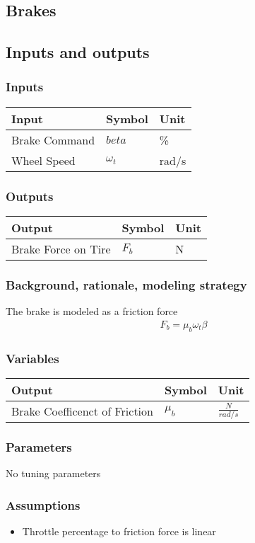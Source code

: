 \documentclass[../SimBALink.tex]{subfiles}
\begin{document}
\subsection{Brakes}

\subsection{Inputs and outputs}
	\subsubsection{Inputs}
	\begin{tabular}{ l | l | l  }
		Input					&	Symbol		&	Unit		\\	\hline
		Brake Command			& 	$beta$ 		&	\% \\
		Wheel Speed				&	$\omega_t$	&	rad/s
	\end{tabular}
	
	\subsubsection{Outputs}
	\begin{tabular}{ l | l | l  }
		Output					&	Symbol		&	Unit		\\	\hline
		Brake Force on Tire		&	$F_b$		&	N
	\end{tabular}

\subsubsection{Background, rationale, modeling strategy}
The brake is modeled as a friction force 
		\begin{gather}
			F_b = \mu_b \omega_t \beta
		\end{gather}

\subsubsection{Variables}
	\begin{tabular}{ l | l | l  }
		Output					&	Symbol		&	Unit		\\	\hline
		Brake Coefficenct of Friction		&	$\mu_b$		&	 $\frac{N}{rad/s}$ 
	\end{tabular}
\subsubsection{Parameters}
No tuning parameters


\subsubsection{Assumptions}
\begin{itemize}
  \item Throttle percentage to friction force is linear
\end{itemize}
\end{document}
